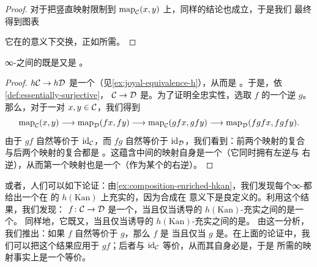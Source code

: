 \begin{proof}
对于把竖直映射限制到 $\mathrm{map}_{\mathcal{C}}(x, y)$ 上，同样的结论也成立，于是我们
最终得到图表
\begin{center}
\end{center}
它在\trNaturalEquivalence{}的意义下交换，正如所需。
\end{proof}

\begin{proposition}\label{prop:joyal-equivalence-fully-faithful-essentially-surjective}
∞-\trCategories{}之间的\trJoyalEquivalence{}既是\trFullyFaithful{}又是%
\trEssentiallySurjective{}。
\end{proposition}

\begin{proof}
\trFunctor{} $h\mathcal{C} \to h\mathcal{D}$ 是一个\trEquivalence{}（见\cref{ex:joyal-equivalence-h}），从而是%
\trEssentiallySurjective{}。于是，依\cref{def:essentially-surjective}，
$\mathcal{C} \to \mathcal{D}$ 是\trEssentiallySurjective{}。为了证明全忠实性，选取 $f$ 的一个逆
$g$。那么，对于一对\trObject{} $x, y \in \mathcal{C}$，我们得到
\[
\mathrm{map}_{\mathcal{C}}(x, y) \longrightarrow \mathrm{map}_{\mathcal{D}}(fx, fy)
\longrightarrow \mathrm{map}_{\mathcal{C}}(gfx, gfy)
\longrightarrow \mathrm{map}_{\mathcal{D}}(fgfx, fgfy).
\]
由于\trFunctor{} $gf$ 自然等价于 $\mathrm{id}_{\mathcal{C}}$，而\trFunctor{} $fg$ 自然等价于
$\mathrm{id}_{\mathcal{D}}$，我们看到：前两个映射的复合与后两个映射的复合都是%
\trEquivalence{}。这蕴含中间的映射自身是一个\trEquivalence{}（它同时拥有左逆与
右逆），从而第一个映射也是一个\trEquivalence{}（作为某个\trEquivalence{}的右逆）。
\end{proof}

\begin{remark}\label{rem:enriched-alternative}
或者，人们可以如下论证：由\cref{ex:composition-enriched-hkan}，我们发现每个∞-\trCategory{}都给出一个在%
\trKanComplex{}的\trHomotopyCategory{} $h(\mathrm{Kan})$ 上充实的\trCategory{}，因为合成在%
\trHomotopy{}意义下是良定义的。利用这个结果，我们发现：\trFunctor{}%
$f\colon \mathcal{C} \to \mathcal{D}$ 是一个\trJoyalEquivalence{}，当且仅当诱导的
$h(\mathrm{Kan})$-充实\trCategories{}之间的\trFunctor{}是一个\trEquivalence{}。
同样地，它既\trFullyFaithful{}又\trEssentiallySurjective{}，当且仅当诱导的
$h(\mathrm{Kan})$-充实\trCategories{}之间的\trFunctor{}是\trFullyFaithful{}。
由这一分析，我们推出：如果 $f$ 自然等价于 $g$，那么 $f$ 是\trFullyFaithful{}%
当且仅当 $g$ 是\trFullyFaithful{}。在上面的论证中，我们可以把这个结果应用于
$gf$；后者与 $\mathrm{id}_{\mathcal{C}}$ 等价，从而其自身必是\trFullyFaithful{}，于是
所需的映射事实上是一个\trHomotopy{}等价。
\end{remark}

